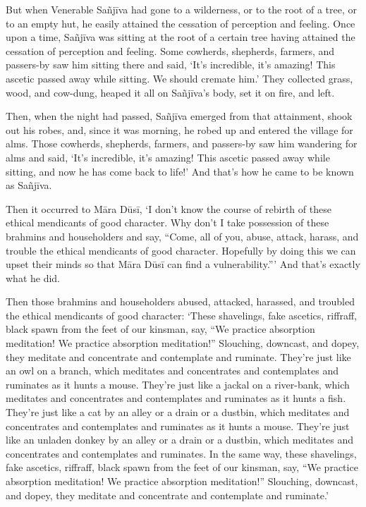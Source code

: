\documentclass[12pt,openany]{book}%
\begin{document}
But when Venerable \textsanskrit{Sañjīva} had gone to a wilderness, or to the root of a tree, or to an empty hut, he easily attained the cessation of perception and feeling. Once upon a time, \textsanskrit{Sañjīva} was sitting at the root of a certain tree having attained the cessation of perception and feeling. Some cowherds, shepherds, farmers, and passers-by saw him sitting there and said, ‘It’s incredible, it’s amazing! This ascetic passed away while sitting. We should cremate him.’ They collected grass, wood, and cow-dung, heaped it all on \textsanskrit{Sañjīva}’s body, set it on fire, and left. 

Then, when the night had passed, \textsanskrit{Sañjīva} emerged from that attainment, shook out his robes, and, since it was morning, he robed up and entered the village for alms. Those cowherds, shepherds, farmers, and passers-by saw him wandering for alms and said, ‘It’s incredible, it’s amazing! This ascetic passed away while sitting, and now he has come back to life!’ And that’s how he came to be known as \textsanskrit{Sañjīva}. 

Then it occurred to \textsanskrit{Māra} \textsanskrit{Dūsī}, ‘I don’t know the course of rebirth of these ethical mendicants of good character. Why don’t I take possession of these brahmins and householders and say, “Come, all of you, abuse, attack, harass, and trouble the ethical mendicants of good character. Hopefully by doing this we can upset their minds so that \textsanskrit{Māra} \textsanskrit{Dūsī} can find a vulnerability.”’ And that’s exactly what he did. 

Then those brahmins and householders abused, attacked, harassed, and troubled the ethical mendicants of good character: ‘These shavelings, fake ascetics, riffraff, black spawn from the feet of our kinsman, say, “We practice absorption meditation! We practice absorption meditation!” Slouching, downcast, and dopey, they meditate and concentrate and contemplate and ruminate. They’re just like an owl on a branch, which meditates and concentrates and contemplates and ruminates as it hunts a mouse. They’re just like a jackal on a river-bank, which meditates and concentrates and contemplates and ruminates as it hunts a fish. They’re just like a cat by an alley or a drain or a dustbin, which meditates and concentrates and contemplates and ruminates as it hunts a mouse. They’re just like an unladen donkey by an alley or a drain or a dustbin, which meditates and concentrates and contemplates and ruminates. In the same way, these shavelings, fake ascetics, riffraff, black spawn from the feet of our kinsman, say, “We practice absorption meditation! We practice absorption meditation!” Slouching, downcast, and dopey, they meditate and concentrate and contemplate and ruminate.’ 
\end{document}

